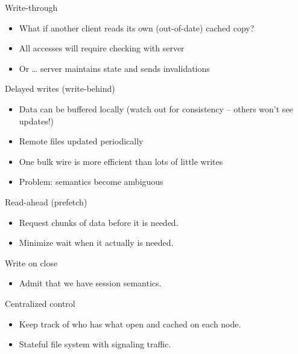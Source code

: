 \begin{slide}

	
	Write-through
	\begin{itemize}
		\item What if another client reads its own (out-of-date) cached copy?
		\item All accesses will require checking with server
		\item Or … server maintains state and sends invalidations
	\end{itemize}
	\bigskip
	
	Delayed writes (write-behind)
	\begin{itemize}
		\item Data can be buffered locally (watch out for consistency – others won’t see updates!)
		\item Remote files updated periodically
		\item One bulk wire is more efficient than lots of little writes
		\item Problem: semantics become ambiguous
	\end{itemize}
	
\end{slide}

\begin{slide}

	
	Read-ahead (prefetch)
	\begin{itemize}
		\item Request chunks of data before it is needed.
		\item Minimize wait when it actually is needed.
	\end{itemize}
	\bigskip
	
	Write on close
	\begin{itemize}
		\item Admit that we have session semantics.
	\end{itemize}
	\bigskip
	
	Centralized control
	\begin{itemize}
		\item Keep track of who has what open and cached on each node.
		\item Stateful file system with signaling traffic.
	\end{itemize}
	
\end{slide}

